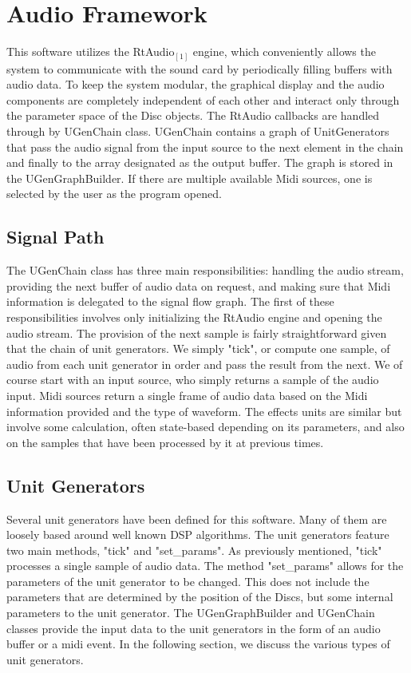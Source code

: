 \documentclass[pdftext,twoside,10pt]{article}
\begin{document}
\section{Audio Framework}

This software utilizes the RtAudio$_{[1]}$ engine, which conveniently allows the system to communicate with the sound card by periodically filling buffers with audio data. To keep the system modular, the graphical display and the audio components are completely independent of each other and interact only through the parameter space of the Disc objects. The RtAudio callbacks are handled through by UGenChain class. UGenChain contains a graph of UnitGenerators that pass the audio signal from the input source to the next element in the chain and finally to the array designated as the output buffer. The graph is stored in the UGenGraphBuilder. If there are multiple available Midi sources, one is selected by the user as the program opened.

\subsection{Signal Path}
The UGenChain class has three main responsibilities: handling the audio stream, providing the next buffer of audio data on request, and making sure that Midi information is delegated to the signal flow graph. The first of these responsibilities involves only initializing the RtAudio engine and opening the audio stream. The provision of the next sample is fairly straightforward given that the chain of unit generators. We simply "tick", or compute one sample, of audio from each unit generator in order and pass the result from the next. We of course start with an input source, who simply returns a sample of the audio input. Midi sources return a single frame of audio data based on the Midi information provided and the type of waveform. The effects units are similar but involve some calculation, often state-based depending on its parameters, and also on the samples that have been processed by it at previous times.

\subsection{Unit Generators}
Several unit generators have been defined for this software. Many of them are loosely based around well known DSP algorithms. The unit generators feature two main methods, "tick" and "set\_params". As previously mentioned, "tick" processes a single sample of audio data. The method "set\_params" allows for the parameters of the unit generator to be changed. This does not include the parameters that are determined by the position of the Discs, but some internal parameters to the unit generator. The UGenGraphBuilder and UGenChain classes provide the input data to the unit generators in the form of an audio buffer or a midi event. In the following section, we discuss the various types of unit generators.
\end{document}
